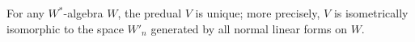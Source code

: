 For any $W^*$-algebra $W$, the predual $V$ is unique; more precisely, $V$ is isometrically isomorphic to the space $W'_n$ generated by all normal linear forms on $W$.
